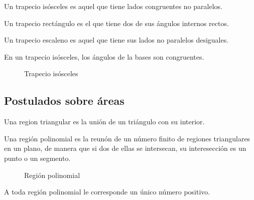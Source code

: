 \begin{definition}
    Un trapecio isósceles es aquel que tiene lados congruentes no paralelos.
\end{definition}

\begin{definition}
    Un trapecio rectángulo es el que tiene dos de sus ángulos internos rectos.    
\end{definition}

\begin{definition}
    Un trapecio escaleno es aquel que tiene sus lados no paralelos desiguales.
\end{definition}

\begin{theorem}
    En un trapecio isósceles, los ángulos de la bases son congruentes.

    \begin{figure}[!h]
        \centering
        
        \caption{Trapecio isósceles}
        \label{fig:theorem16}
    \end{figure}
    
\end{theorem}

\subsection{Postulados sobre áreas}

\begin{definition}
    Una region triangular es la unión de un triángulo con su interior.
\end{definition}

\begin{definition}
    Una región polinomial es la reunón de un número finito de regiones triangulares en un plano, de manera que si dos de ellas se intersecan, su interesección es un punto o un segmento.

    \begin{figure}[!h]
        \centering
        
        \caption{Región polinomial}
        \label{fig:region-polinomial}
    \end{figure}
    
\end{definition}

\begin{postulate}
    A toda región polinomial le corresponde un único número positivo.
\end{postulate}

